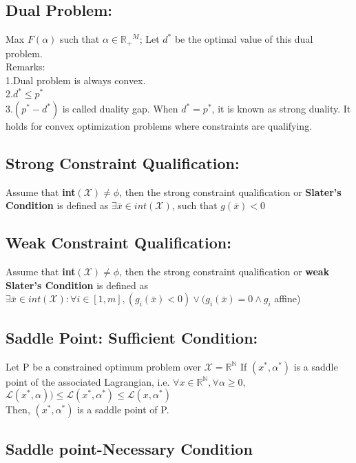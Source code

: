 \documentclass[a4paper,english,12pt]{article}
\newcommand\tab[1][1cm]{\hspace*{#1}}
\begin{document}
{\subsection{Dual Problem:}
Max $F(\alpha)$ such that $\alpha \in \mathbb{R_{+}}^M$; \tab Let $d^*$ be the optimal value of this dual problem.\\
Remarks:\\
1.Dual problem is always convex.\\
2.$d^* \leq p^*$\\
3.$(p^* - d^*)$ is called duality gap. When $d^* = p^*$, it is known as strong duality. It holds for convex optimization problems where constraints are qualifying.\\
\subsection{Strong Constraint Qualification:}
Assume that \textbf{int}$(\mathscr{X}) \neq \phi$, then the strong constraint qualification or \textbf{Slater's Condition} is defined as $\exists\bar{x} \in int(\mathscr{X})$, such that $g(\bar x) < 0$\\
\subsection{Weak Constraint Qualification:}
Assume that \textbf{int}$(\mathscr{X}) \neq \phi$, then the strong constraint qualification or \textbf{weak Slater's Condition} is defined as $\exists\bar{x} \in int(\mathscr{X}):\forall i \in [1,m],(g_i(\bar x) < 0)\vee(g_i(\bar x) = 0 \wedge g_i$ affine)\\
\subsection{Saddle Point: Sufficient Condition:}
Let P be a constrained optimum problem over $\mathscr{X} = \mathbb{R^N}$ If $(x^*,\alpha^*)$ is a saddle point of the associated Lagrangian, i.e. $\forall x\in \mathbb{R^N}, \forall\alpha\geq0,$
$\mathscr{L}(x^*,\alpha)) \leq \mathscr{L}(x^*,\alpha^*)\leq \mathscr{L}(x,\alpha^*)$\\
Then, $(x^*,\alpha^*)$ is a saddle point of P.\\
\subsection{Saddle point-Necessary Condition}
\begin{itemize}
	

\end{itemize}}
\end{document}
